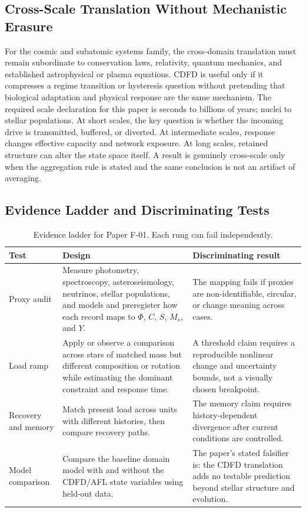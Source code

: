 \documentclass[11pt,a4paper]{article}
\begin{document}
\subsection{Cross-Scale Translation Without Mechanistic Erasure}

For the cosmic and subatomic systems family, the cross-domain translation must remain subordinate to conservation laws, relativity, quantum mechanics, and established astrophysical or plasma equations. CDFD is useful only if it compresses a regime transition or hysteresis question without pretending that biological adaptation and physical response are the same mechanism. \cite{Turing1952,Shannon1948,BakTangWiesenfeld1987}
The required scale declaration for this paper is seconds to billions of years; nuclei to stellar populations. At short
scales, the key question is whether the incoming drive is transmitted,
buffered, or diverted. At intermediate scales, response changes effective
capacity and network exposure. At long scales, retained structure can alter the
state space itself. A result is genuinely cross-scale only when the aggregation
rule is stated and the same conclusion is not an artifact of averaging.

\subsection{Evidence Ladder and Discriminating Tests}

\begin{table}[htbp]
\centering
\small
\caption{Evidence ladder for Paper F-01. Each rung can fail independently.}
\begin{tabularx}{\textwidth}{|p{}|X|X|}
\hline
\textbf{Test} & \textbf{Design} & \textbf{Discriminating result} \\
\hline
Proxy audit & Measure photometry, spectroscopy, asteroseismology, neutrinos, stellar populations, and models and preregister how each record maps to $\Phi$, $C$, $S$, $M_s$, and $Y$. & The mapping fails if proxies are non-identifiable, circular, or change meaning across cases. \\
\hline
Load ramp & Apply or observe a comparison across stars of matched mass but different composition or rotation while estimating the dominant constraint and response time. & A threshold claim requires a reproducible nonlinear change and uncertainty bounds, not a visually chosen breakpoint. \\
\hline
Recovery and memory & Match present load across units with different histories, then compare recovery paths. & The memory claim requires history-dependent divergence after current conditions are controlled. \\
\hline
Model comparison & Compare the baseline domain model with and without the CDFD/AFL state variables using held-out data. & The paper's stated falsifier is: the CDFD translation adds no testable prediction beyond stellar structure and evolution. \\
\hline
\end{tabularx}
\end{table}
\end{document}
